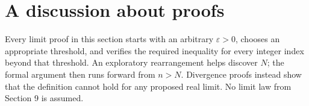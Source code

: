 \section{A discussion about proofs}
\label{sec:direct-limit-proofs}
Every limit proof in this section starts with an arbitrary
$\varepsilon>0$, chooses an appropriate threshold, and verifies the
required inequality for every integer index beyond that threshold.
An exploratory rearrangement helps discover $N$; the formal argument
then runs forward from $n>N$. Divergence proofs instead show that
the definition cannot hold for any proposed real limit.
No limit law from Section 9 is assumed.



